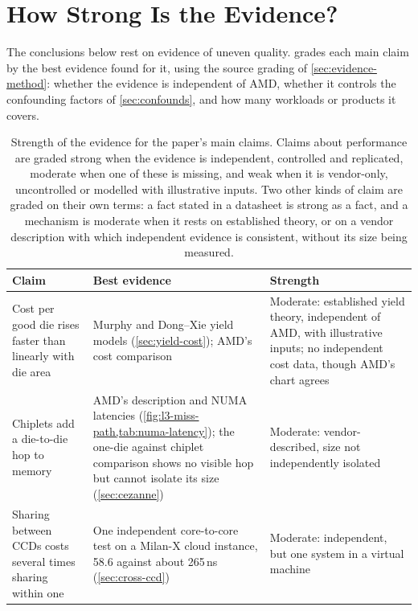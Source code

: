 \section{How Strong Is the Evidence?}
\label{sec:evidence-strength}
The conclusions below rest on evidence of uneven quality.  grades each main claim by the best evidence found for it, using the source grading of \cref{sec:evidence-method}: whether the evidence is independent of AMD, whether it controls the confounding factors of \cref{sec:confounds}, and how many workloads or products it covers.

\begin{table}[htbp]
  \centering
  \caption[Strength of the evidence for the paper's main claims]{Strength of the evidence for the paper's main claims. Claims about performance are graded strong when the evidence is independent, controlled and replicated, moderate when one of these is missing, and weak when it is vendor-only, uncontrolled or modelled with illustrative inputs. Two other kinds of claim are graded on their own terms: a fact stated in a datasheet is strong as a fact, and a mechanism is moderate when it rests on established theory, or on a vendor description with which independent evidence is consistent, without its size being measured.}
  \label{tab:evidence-strength}
  \footnotesize
  \begin{tabularx}{\textwidth}{@{}>{\raggedright\arraybackslash}p{3.3cm}>{\raggedright\arraybackslash}X>{\raggedright\arraybackslash}p{3.6cm}@{}}
    \toprule
    \textbf{Claim} & \textbf{Best evidence} & \textbf{Strength} \\
    \midrule
    Cost per good die rises faster than linearly with die area & Murphy and Dong--Xie yield models (\cref{sec:yield-cost}); AMD's cost comparison \cite{naffziger2020chiplet} & Moderate: established yield theory, independent of AMD, with illustrative inputs; no independent cost data, though AMD's chart agrees \\
    Chiplets add a die-to-die hop to memory & AMD's description and NUMA latencies (\cref{fig:l3-miss-path,tab:numa-latency}); the one-die against chiplet comparison shows no visible hop but cannot isolate its size (\cref{sec:cezanne}) & Moderate: vendor-described, size not independently isolated \\
    Sharing between CCDs costs several times sharing within one & One independent core-to-core test on a Milan-X cloud instance, 58.6 against about 265\,ns (\cref{sec:cross-ccd}) & Moderate: independent, but one system in a virtual machine \\

\end{tabularx}
\end{table}
